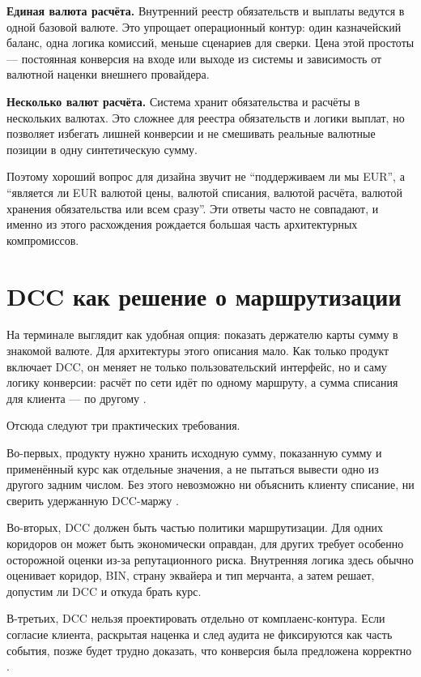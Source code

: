 \textbf{Единая валюта расчёта.} Внутренний реестр обязательств
и выплаты ведутся в одной базовой валюте. Это упрощает
операционный контур: один казначейский баланс, одна логика
комиссий, меньше сценариев для сверки. Цена этой простоты ---
постоянная конверсия на входе или выходе из системы
и зависимость от валютной наценки внешнего провайдера.

\textbf{Несколько валют расчёта.} Система хранит обязательства
и расчёты в нескольких валютах. Это сложнее для реестра
обязательств и логики выплат, но позволяет избегать лишней
конверсии и не смешивать реальные валютные позиции
в одну синтетическую сумму.

Поэтому хороший вопрос для дизайна звучит не \enquote{поддерживаем ли
мы EUR}, а \enquote{является ли EUR валютой цены, валютой списания,
валютой расчёта, валютой хранения обязательства или всем сразу}.
Эти ответы часто не совпадают, и именно из этого расхождения
рождается большая часть архитектурных компромиссов.

\section{DCC как решение о маршрутизации}
\label{sec:mc-dcc}

На терминале  выглядит как удобная опция: показать держателю
карты сумму в знакомой валюте. Для архитектуры этого описания
мало. Как только продукт включает DCC, он меняет не только
пользовательский интерфейс, но и саму логику конверсии:
расчёт по сети идёт по одному маршруту, а сумма списания для клиента ---
по другому \cite{visa-core-rules,mc-tpr}.

Отсюда следуют три практических требования.

Во-первых, продукту нужно хранить исходную сумму, показанную
сумму и применённый курс как отдельные значения, а не пытаться
вывести одно из другого задним числом. Без этого невозможно
ни объяснить клиенту списание, ни сверить удержанную DCC-маржу
\cite{visa-core-rules,mc-tpr}.

Во-вторых, DCC должен быть частью политики маршрутизации. Для одних
коридоров он может быть экономически оправдан, для других
требует особенно осторожной оценки из-за репутационного риска.
Внутренняя логика здесь обычно оценивает коридор, BIN,
страну эквайера и тип мерчанта, а затем решает, допустим ли
DCC и откуда брать курс.

В-третьих, DCC нельзя проектировать отдельно от комплаенс-контура.
Если согласие клиента, раскрытая наценка и след аудита
не фиксируются как часть события, позже будет трудно доказать,
что конверсия была предложена корректно
\cite{visa-core-rules,mc-tpr}.


